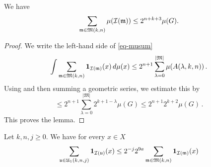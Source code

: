 \begin{lemma}
\label{top-tiles}
\leanok
{}
    We have
    \begin{equation}\label{eq-musum}
        \sum_{\mathfrak{m} \in \mathfrak{M}(k,n)} \mu({\mathcal{I}}(\mathfrak{m}))\le 2^{n+k+3}\mu(G).
    \end{equation}
\end{lemma}
\begin{proof}
\leanok
We write the left-hand side of \eqref{eq-musum}
\begin{equation}
    \int \sum_{\mathfrak{m} \in \mathfrak{M}(k,n)} \mathbf{1}_{{\mathcal{I}}(\mathfrak{m})}(x) \, d\mu(x) \le
2^{n+1} \sum_{\lambda=0}^{|\mathfrak{M}|}\mu(A(\lambda, k,n))\,.
\end{equation}
Using 
and then summing a geometric series, we estimate this by
\begin{equation}
    \le
2^{n+1}\sum_{\lambda=0}^{|\mathfrak{M}|}
2^{k+1-\lambda}\mu(G)
\le
2^{n+1}2^{k+2}\mu(G)\, .
\end{equation}
This proves the lemma.
\end{proof}


\begin{lemma}
\label{tree-count}
\leanok
{}
Let $k,n,j\ge 0$. We have for every $x\in X$
\begin{equation}
    \sum_{{\mathfrak u}\in {\mathfrak U}_1(k,n,j)} \mathbf{1}_{{\mathcal{I}}({\mathfrak u})}(x)
    \le 2^{-j}
    2^{9a} \sum_{\mathfrak{m}\in \mathfrak{M}(k,n)}
     \mathbf{1}_{{\mathcal{I}}(\mathfrak{m})}(x)
\end{equation}
\end{lemma}

